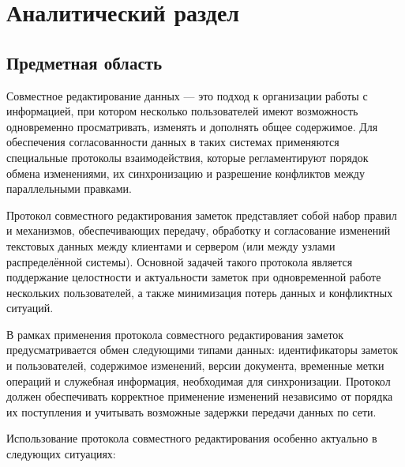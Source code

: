 \chapter{Аналитический раздел}

\section{Предметная область}

Совместное редактирование данных — это подход к организации работы с информацией, при котором несколько пользователей имеют возможность одновременно просматривать, изменять и дополнять общее содержимое. Для обеспечения согласованности данных в таких системах применяются специальные протоколы взаимодействия, которые регламентируют порядок обмена изменениями, их синхронизацию и разрешение конфликтов между параллельными правками.

Протокол совместного редактирования заметок представляет собой набор правил и механизмов, обеспечивающих передачу, обработку и согласование изменений текстовых данных между клиентами и сервером (или между узлами распределённой системы). Основной задачей такого протокола является поддержание целостности и актуальности заметок при одновременной работе нескольких пользователей, а также минимизация потерь данных и конфликтных ситуаций.

В рамках применения протокола совместного редактирования заметок предусматривается обмен следующими типами данных: идентификаторы заметок и пользователей, содержимое изменений, версии документа, временные метки операций и служебная информация, необходимая для синхронизации. Протокол должен обеспечивать корректное применение изменений независимо от порядка их поступления и учитывать возможные задержки передачи данных по сети.

Использование протокола совместного редактирования особенно актуально в следующих ситуациях:

